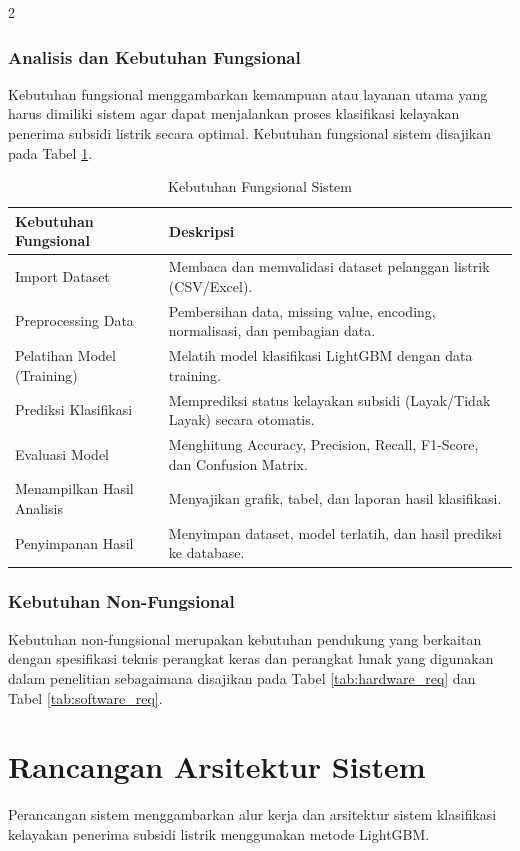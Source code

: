\documentclass[12pt, a4paper, onecolumn, oneside]{report}
\begin{document}
\begin{spacing}{2}
\subsubsection{Analisis dan Kebutuhan Fungsional}
Kebutuhan fungsional menggambarkan kemampuan atau layanan utama yang harus dimiliki sistem agar dapat menjalankan proses klasifikasi kelayakan penerima subsidi listrik secara optimal. Kebutuhan fungsional sistem disajikan pada Tabel \ref{tab:kebutuhan_fungsional_s1}.

\begin{table}[H]
\centering
\caption{Kebutuhan Fungsional Sistem}
\label{tab:kebutuhan_fungsional_s1}
\begin{tabularx}{\textwidth}{|p{4.5cm}|X|}
\hline
\textbf{Kebutuhan Fungsional} & \textbf{Deskripsi} \\ \hline
Import Dataset & Membaca dan memvalidasi dataset pelanggan listrik (CSV/Excel). \\ \hline
Preprocessing Data & Pembersihan data, missing value, encoding, normalisasi, dan pembagian data. \\ \hline
Pelatihan Model (Training) & Melatih model klasifikasi LightGBM dengan data training. \\ \hline
Prediksi Klasifikasi & Memprediksi status kelayakan subsidi (Layak/Tidak Layak) secara otomatis. \\ \hline
Evaluasi Model & Menghitung Accuracy, Precision, Recall, F1-Score, dan Confusion Matrix. \\ \hline
Menampilkan Hasil Analisis & Menyajikan grafik, tabel, dan laporan hasil klasifikasi. \\ \hline
Penyimpanan Hasil & Menyimpan dataset, model terlatih, dan hasil prediksi ke database. \\ \hline
\end{tabularx}
\end{table}

\subsubsection{Kebutuhan Non-Fungsional}
Kebutuhan non-fungsional merupakan kebutuhan pendukung yang berkaitan dengan spesifikasi teknis perangkat keras dan perangkat lunak yang digunakan dalam penelitian sebagaimana disajikan pada Tabel \ref{tab:hardware_req} dan Tabel \ref{tab:software_req}.

\section{Rancangan Arsitektur Sistem}
Perancangan sistem menggambarkan alur kerja dan arsitektur sistem klasifikasi kelayakan penerima subsidi listrik menggunakan metode LightGBM.


\end{spacing}
\end{document}
